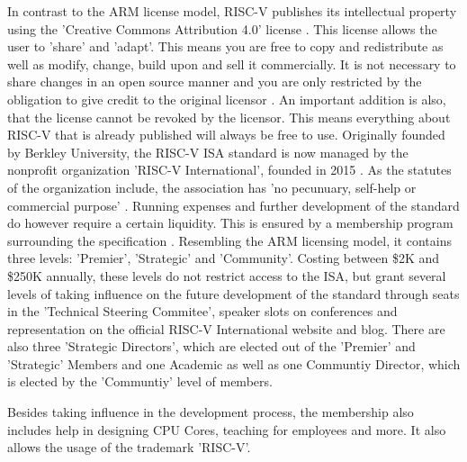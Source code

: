 \documentclass[conference]{IEEEtran}
\begin{document}
	In contrast to the ARM license model, RISC-V publishes its intellectual property using the 'Creative Commons Attribution 4.0' license \cite{Waterman2017}\cite{Waterman2017a}. This license allows the user to 'share' and 'adapt'. This means you are free to copy and redistribute as well as modify, change, build upon and sell it commercially. It is not necessary to share changes in an open source manner and you are only restricted by the obligation to give credit to the original licensor \cite{CC}. An important addition is also, that the license cannot be revoked by the licensor. This means everything about RISC-V that is already published will always be free to use.
	Originally founded by Berkley University, the RISC-V \gls{ISA} standard is now managed by the nonprofit organization 'RISC-V International', founded in 2015 \cite{RVIAbout}. As the statutes of the organization include, the association has 'no pecunuary, self-help or commercial purpose' \cite{RVIArt}. Running expenses and further development of the standard do however require a certain liquidity. This is ensured by a membership program surrounding the specification \cite{RVIMem}. Resembling the ARM licensing model, it contains three levels: 'Premier', 'Strategic' and 'Community'. Costing between \$2K and \$250K annually, these levels do not restrict access to the \gls{ISA}, but grant several levels of taking influence on the future development of the standard through seats in the 'Technical Steering Commitee', speaker slots on conferences and representation on the official RISC-V International website and blog. There are also three 'Strategic Directors', which are elected out of the 'Premier' and 'Strategic' Members and one Academic as well as one Communtiy Director, which is elected by the 'Communtiy' level of members. \cite{RVIAss}

	Besides taking influence in the development process, the membership also includes help in designing \gls{CPU} Cores, teaching for employees and more. It also allows the usage of the trademark 'RISC-V'.
\end{document}
